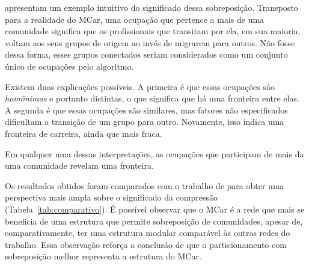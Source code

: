 \documentclass[
  article,
  11pt,
  a4paper,
  english,
  brazil,
  sumario=tradicional]{abntex2}
\begin{document}
 apresentam um exemplo intuitivo do significado dessa sobreposição. Transposto para a realidade do MCar, uma ocupação que pertence a mais de uma comunidade significa que os profissionais que transitam por ela, em sua maioria, voltam aos seus grupos de origem ao invés de migrarem para outros. Não fosse dessa forma, esses grupos conectados seriam considerados como um conjunto único de ocupações pelo algoritmo.

Existem duas explicações possíveis. A primeira é que essas ocupações são \textit{homônimas} e portanto distintas, o que significa que há uma fronteira entre elas. A segunda é que essas ocupações são similares, mas fatores não especificados dificultam a transição de um grupo para outro. Novamente, isso indica uma fronteira de carreira, ainda que mais fraca.

Em qualquer uma dessas interpretações, as ocupações que participam de mais da uma comunidade revelam uma fronteira.

Os resultados obtidos foram comparados com o trabalho de  para obter uma perspectiva mais ampla sobre o significado da compressão (Tabela~\ref{tab:comparativo}). É possível observar que o MCar é a rede que mais se beneficia de uma estrutura que permite sobreposição de comunidades, apesar de, comparativamente, ter uma estrutura modular comparável às outras redes do trabalho. Essa observação reforça a conclusão de que o particionamento com sobreposição melhor representa a estrutura do MCar.
\end{document}
